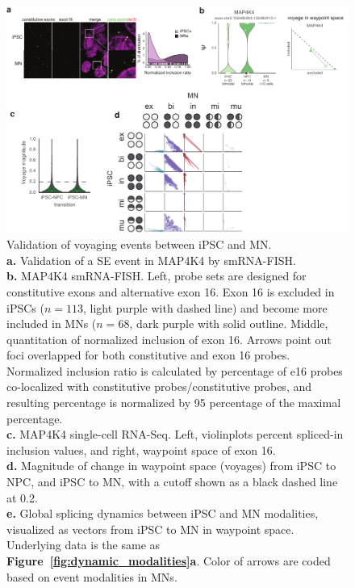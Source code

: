 \begin{figure}[h]
  \centering
  \includegraphics[width=5.8in]{figures/bonvoyage_supplementary.pdf}
  \caption[Validation of voyaging events between iPSC and MN.]{Validation of voyaging events between iPSC and MN.\\
\textbf{a.} Validation of a SE event in MAP4K4 by smRNA-FISH.\\
\textbf{b.} MAP4K4 smRNA-FISH. Left, probe sets are designed for constitutive exons and alternative exon 16. Exon 16 is excluded in iPSCs ($n = 113$, light purple with dashed line) and become more included in MNs ($n = 68$, dark purple with solid outline. Middle, quantitation of normalized inclusion of exon 16. Arrows point out foci overlapped for both constitutive and exon 16 probes. Normalized inclusion ratio is calculated by percentage of e16 probes co-localized with constitutive probes/constitutive probes, and resulting percentage is normalized by 95 percentage of the maximal percentage.\\
\textbf{c.} MAP4K4 single-cell RNA-Seq. Left, violinplots percent spliced-in inclusion values, and right, waypoint space of exon 16.\\
\textbf{d.} Magnitude of change in waypoint space (voyages) from iPSC to NPC, and iPSC to MN, with a cutoff shown as a black dashed line at 0.2.\\
\textbf{e.} Global splicing dynamics between iPSC and MN modalities, visualized as vectors from iPSC to MN  in waypoint space. Underlying data is the same as \textbf{Figure~\ref{fig:dynamic_modalities}a}. Color of arrows are coded based on event modalities in MNs.
}
\end{figure}


